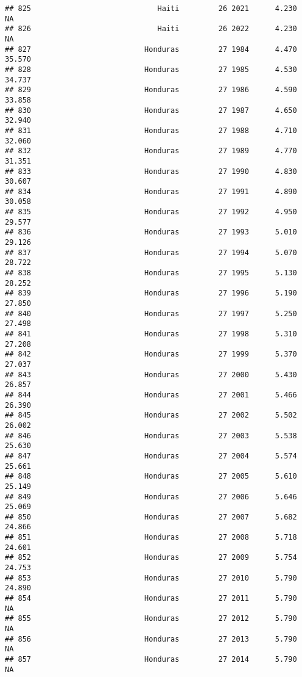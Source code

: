 \documentclass[
]{article}
\begin{document}
\begin{verbatim}
## 825                             Haiti         26 2021      4.230         NA
## 826                             Haiti         26 2022      4.230         NA
## 827                          Honduras         27 1984      4.470     35.570
## 828                          Honduras         27 1985      4.530     34.737
## 829                          Honduras         27 1986      4.590     33.858
## 830                          Honduras         27 1987      4.650     32.940
## 831                          Honduras         27 1988      4.710     32.060
## 832                          Honduras         27 1989      4.770     31.351
## 833                          Honduras         27 1990      4.830     30.607
## 834                          Honduras         27 1991      4.890     30.058
## 835                          Honduras         27 1992      4.950     29.577
## 836                          Honduras         27 1993      5.010     29.126
## 837                          Honduras         27 1994      5.070     28.722
## 838                          Honduras         27 1995      5.130     28.252
## 839                          Honduras         27 1996      5.190     27.850
## 840                          Honduras         27 1997      5.250     27.498
## 841                          Honduras         27 1998      5.310     27.208
## 842                          Honduras         27 1999      5.370     27.037
## 843                          Honduras         27 2000      5.430     26.857
## 844                          Honduras         27 2001      5.466     26.390
## 845                          Honduras         27 2002      5.502     26.002
## 846                          Honduras         27 2003      5.538     25.630
## 847                          Honduras         27 2004      5.574     25.661
## 848                          Honduras         27 2005      5.610     25.149
## 849                          Honduras         27 2006      5.646     25.069
## 850                          Honduras         27 2007      5.682     24.866
## 851                          Honduras         27 2008      5.718     24.601
## 852                          Honduras         27 2009      5.754     24.753
## 853                          Honduras         27 2010      5.790     24.890
## 854                          Honduras         27 2011      5.790         NA
## 855                          Honduras         27 2012      5.790         NA
## 856                          Honduras         27 2013      5.790         NA
## 857                          Honduras         27 2014      5.790         NA

\end{verbatim}
\end{document}
